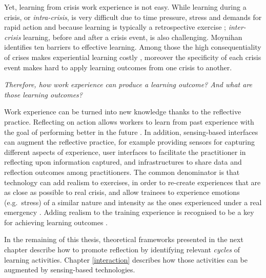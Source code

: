 Yet, learning from crisis work experience is not easy. While learning during a crisis, or \emph{intra-crisis}, is very difficult due to time pressure, stress and demands for rapid action \autocite{Deverell:2009fk} and because learning is typically a retrospective exercise \autocite{jasanoff1994learning}; \emph{inter-crisis} learning, before and after a crisis event, is also challenging. Moynihan \autocite*{Moynihan:2008gq} identifies ten barriers to effective learning. Among those the high consequentiality of crises makes experiential learning costly \autocite{LaPorte:1991gk}, moreover the specificity of each crisis event makes hard to apply learning outcomes from one crisis to another.

\emph{Therefore, how work experience can produce a learning outcome? And what are those learning outcomes?}

Work experience can be turned into new knowledge thanks to the reflective practice. Reflecting on action allows workers to learn from past experience with the goal of performing better in the future \autocites{boud1985reflection}{Schon:1983ut}. In addition, sensing-based interfaces can augment the reflective practice, for example providing sensors for capturing different aspects of experience, user interfaces to facilitate the practitioner in reflecting upon information captured, and infrastructures to share data and reflection outcomes among practitioners. The common denominator is that technology can add realism to exercises, in order to re-create experiences that are as close as possible to real crisis, and allow trainees to experience emotions (e.g.~stress) of a similar nature and intensity as the ones experienced under a real emergency \autocite{MacKinnon:2012wz}. Adding realism to the training experience is recognised to be a key for achieving learning outcomes \autocite{Asproth:2013vs}.

In the remaining of this thesis, theoretical frameworks presented in the next chapter describe how to promote reflection by identifying relevant \emph{cycles} of learning activities. Chapter \ref{interaction} describes how those activities can be augmented by sensing-based technologies. 
